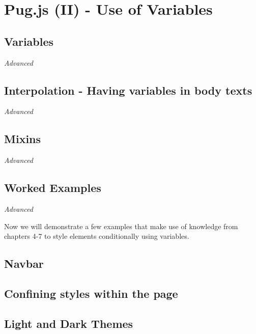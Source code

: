 \chapter{Pug.js (II) - Use of Variables}

\section{Variables}

\textit{Advanced}
\vspace{6mm}


\section{Interpolation - Having variables in body texts}

\textit{Advanced}
\vspace{6mm}

\section{Mixins}

\textit{Advanced}
\vspace{6mm}

\section{Worked Examples}

\textit{Advanced}
\vspace{6mm}

Now we will demonstrate a few examples that make use of knowledge from chapters 4-7 to style elements conditionally using variables.

\section{Navbar}

\section{Confining styles within the page}
\label{sec:confinestyles}

\section{Light and Dark Themes}
